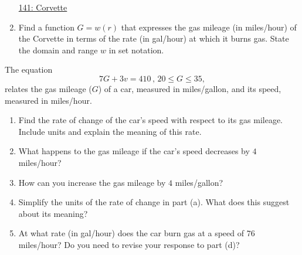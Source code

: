 \documentclass{ximera}
\begin{document}
\begin{question}
\begin{enumerate}
\begin{onlineOnly}
    \begin{center}
\end{center}
\end{onlineOnly}

\href{https://www.desmos.com/calculator/2fq4txcouq}{141: Corvette}

\item Find a function $G=w(r)$ that expresses the gas mileage (in miles/hour) of the Corvette in terms of the rate (in gal/hour) at which it burns gas. State the domain and range $w$ in set notation.

\end{enumerate}
\end{question}

\begin{question}  \label{Q43rtg4r54r32}
The equation
\[
    7G + 3v = 410 \, , \, 20\leq G \leq 35 ,
\]
relates the gas mileage ($G$) of a car, measured in miles/gallon, and its speed, measured in miles/hour.

\begin{enumerate}
\item{Find the rate of change of the car's speed with respect to its gas mileage. Include units and explain the meaning of this rate.}

\item{What happens to the gas mileage if the car's speed decreases by $4$ miles/hour?}

\item{How can you increase the gas mileage by $4$ miles/gallon?}

\item{Simplify the units of the rate of change in part (a). What does this suggest about its meaning?}

\item{At what rate (in gal/hour) does the car burn gas at a speed of $76$ miles/hour? Do you need to revise your response to part (d)?}
\end{enumerate}
\end{question}
\end{document}
